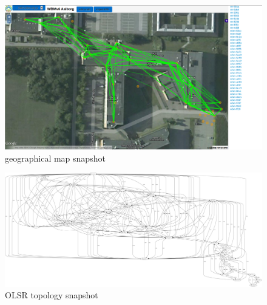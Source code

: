 \documentclass[a4paper,12pt,twoside]{article}
\begin{document}
\begin{figure}[!ht]
\centering
\includegraphics[width=1.4\textwidth, angle=90]{figures/geographical_map2.png}
\caption{geographical map snapshot}
\label{fig:geomap}
\end{figure}



\begin{figure}[!ht]
\centering
\includegraphics[width=1.4\textwidth, angle=90]{figures/topo0.pdf}
\caption{OLSR topology snapshot}
\label{fig:olsr-topo}
\end{figure}

%


\end{document}
